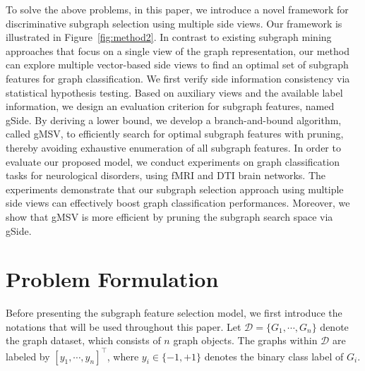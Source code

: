 \documentclass[conference]{IEEEtran}
\newcommand{\gscore}[0]{gSide}
\newcommand{\galgo}[0]{gMSV}
\begin{document}
To solve the above problems, in this paper, we introduce a novel framework for discriminative subgraph selection using multiple side views. Our framework is illustrated in Figure~\ref{fig:method2}. In contrast to existing subgraph mining approaches that focus on a single view of the graph representation, our method can explore multiple vector-based side views to find an optimal set of subgraph features for graph classification. We first verify side information consistency via statistical hypothesis testing. Based on auxiliary views and the available label information, we design an evaluation criterion for subgraph features, named {\gscore}. By deriving a lower bound, we develop a branch-and-bound algorithm, called {\galgo}, to efficiently search for optimal subgraph features with pruning, thereby avoiding exhaustive enumeration of all subgraph features. In order to evaluate our proposed model, we conduct experiments on graph classification tasks for neurological disorders, using fMRI and DTI brain networks. The experiments demonstrate that our subgraph selection approach using multiple side views can effectively boost graph classification performances. Moreover, we show that {\galgo} is more efficient by pruning the subgraph search space via {\gscore}.


\section{Problem Formulation}\label{sec:problem}

Before presenting the subgraph feature selection model, we first introduce the notations that will be used throughout this paper. Let $\mathcal{D}=\{G_1,\cdots,G_n\}$ denote the graph dataset, which consists of $n$ graph objects. The graphs within $\mathcal{D}$ are labeled by $[y_1,\cdots,y_n]^\top$, where $y_i\in\{-1,+1\}$ denotes the binary class label of $G_i$.
\end{document}
